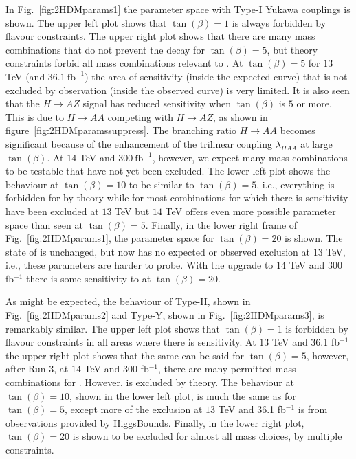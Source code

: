In Fig.~\ref{fig:2HDMparams1} the parameter space with Type-I Yukawa couplings is shown.
The upper left plot shows that \(\tan(\beta) = 1\) is always forbidden by flavour constraints.
The upper right plot shows that there are many mass combinations that do not prevent the decay \AZH{} for \(\tan(\beta) = 5\),
but theory constraints forbid all mass combinations relevant to \HZA{}.
At \(\tan(\beta) = 5\) for \(13\) TeV (and \(36.1~\text{fb}^{-1}\)) the area of sensitivity (inside the expected curve) that is not excluded by observation (inside the observed curve) is very limited. 
It is also seen that the \(H\rightarrow AZ\) signal has reduced sensitivity when \(\tan(\beta)\) is \(5\) or more.
This is due to \(H\rightarrow AA\) competing with \(H\rightarrow AZ\), as shown in figure~\ref{fig:2HDMparamssuppress}.
The branching ratio \(H\rightarrow AA\) becomes significant because of the enhancement of the trilinear coupling \(\lambda_{HAA}\) at large \(\tan(\beta)\).
At \(14\) TeV and \(300~\text{fb}^{-1}\), however, we expect many mass combinations to be testable that have not yet been excluded.
The lower left plot shows the behaviour at \(\tan(\beta) = 10\) to be similar to \(\tan(\beta) = 5\), i.e., 
everything is forbidden for \HZA{} by theory while for \AZH{} most combinations for which there is sensitivity have been excluded at \(13\) TeV
but \(14\) TeV offers even more possible parameter space than seen at \(\tan(\beta) = 5\).
Finally, in the lower right frame of Fig.~\ref{fig:2HDMparams1}, the parameter space for \(\tan(\beta) = 20\) is shown.
The state of \HZA{} is unchanged, but now \AZH{} has no expected or observed exclusion at \(13\) TeV, i.e., these parameters are harder to probe.
With the upgrade to \(14\) TeV and 300 fb$^{-1}$ there is some sensitivity to \AZH{} at \(\tan(\beta) = 20\).

As might be expected, the behaviour of Type-II, shown in Fig.~\ref{fig:2HDMparams2} and Type-Y, shown in Fig.~\ref{fig:2HDMparams3}, is remarkably similar.
The upper left plot shows that \(\tan(\beta) = 1\) is forbidden by flavour constraints in all areas where there is sensitivity.
At \(13\) TeV  and 36.1 fb$^{-1}$ the upper right plot shows that the same can be said for \(\tan(\beta) = 5\), however,
after Run 3,  at \(14\) TeV and 300 fb$^{-1}$, there are many permitted mass combinations for \AZH{}. However, 
\HZA{} is excluded by theory.
The behaviour at \(\tan(\beta) = 10\), shown in the lower left plot, is much the same as for \(\tan(\beta) = 5\),
except more of the exclusion at \(13\) TeV and 36.1 fb$^{-1}$  is from observations provided by HiggsBounds.
Finally, in the lower right plot, \(\tan(\beta) = 20\) is shown to be excluded for almost all mass choices,
by multiple constraints.

